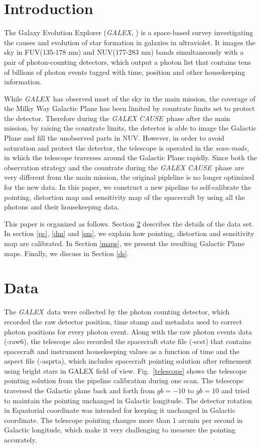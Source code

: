 \documentclass[12pt, preprint]{aastex}
\newcommand{\project}[1]{\textsl{#1}}
\newcommand{\galex}{\project{GALEX}}
\newcommand{\cause}{\project{GALEX CAUSE}}
\newcommand{\scanmode}{\project{scan-mode}}
\begin{document}
\section{Introduction}
The Galaxy Evolution Explorer (\galex, \cite{galex1}) is a space-based survey investigating the causes and evolution of star formation in galaxies in ultraviolet. 
It images the sky in FUV(135-178 nm) and NUV(177-283 nm) bands simultaneously with a pair of photon-counting detectors, which output a photon list that contains tens of billions of photon events tagged with time, position and other housekeeping information.

While \galex\ has observed most of the sky in the main mission, the coverage of the Milky Way Galactic Plane has been limited by countrate limits set to protect the detector.
Therefore during the \cause\ phase after the main mission, by raising the countrate limits, the detector is able to image the Galactic Plane and fill the unobserved parts in NUV.
However, in order to avoid saturation and protect the detector, the telescope is operated in the \scanmode, in which the telescope traverses around the Galactic Plane rapidly.
Since both the observation strategy and the countrate during the \cause\ phase are very different from the main mission, the original pipleline is no longer optimized for the new data.
In this paper, we construct a new pipeline to self-calibrate the pointing, distortion map and sensitivity map of the spacecraft by using all the photons and their housekeeping data.

This paper is organized as follows. 
Section \ref{data} describes the details of the data set.
In section \ref{pc}, \ref{dm} and \ref{sm}, we explain how pointing, distortion and sensitivity map are calibrated.
In Section \ref{maps}, we present the resulting Galactic Plane maps.
Finally, we discuss in Section \ref{ds}.

\section{Data}
\label{data}
The \galex\ data were collected by the photon counting detector, which recorded the raw detector position, time stamp and metadata used to correct photon positions for every photon event.
Along with the raw photon events data (-raw6), the telescope also recorded the spacecraft state file (-scst) that contains spacecraft and instrument housekeeping values as a function of time and the aspect file (-asprta), which includes spacecraft pointing solution after refinement using bright stars in GALEX field of view.
Fig.~\ref{telescope} shows the telescope pointing solution from the pipeline calibration during one scan.
The telescope traversed the Galactic plane back and forth from $gb=-10$ to $gb=10$ and tried to maintain the pointing unchanged in Galactic longitude.
The detector rotation in Equatorial coordinate was intended for keeping it unchanged in Galactic coordinate.
The telescope pointing changes more than 1 arcmin per second in Galactic longitude, which make it very challenging to measure the pointing accurately.
\end{document}
